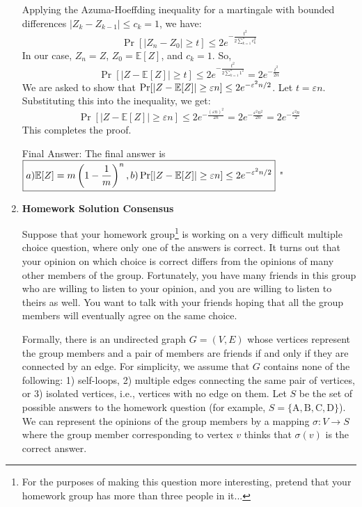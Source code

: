 \begin{enumerate}
\begin{shaded}
Applying the Azuma-Hoeffding inequality for a martingale with bounded differences $|Z_k - Z_{k-1}| \leq c_k = 1$, we have:
$$ \Pr[|Z_n - Z_0| \ge t] \leq 2e^{-\frac{t^2}{2 \sum_{k=1}^n c_k^2}} $$
In our case, $Z_n = Z$, $Z_0 = \mathbb E[Z]$, and $c_k = 1$. So,
$$ \Pr[|Z - \mathbb E[Z]| \ge t] \leq 2e^{-\frac{t^2}{2 \sum_{k=1}^n 1^2}} = 2e^{-\frac{t^2}{2n}} $$
We are asked to show that $\Pr[|Z - \mathbb{E}[Z]| \ge \varepsilon n] \leq 2e^{-\varepsilon^2 n/2}$. Let $t = \varepsilon n$. Substituting this into the inequality, we get:
$$ \Pr[|Z - \mathbb E[Z]| \ge \varepsilon n] \leq 2e^{-\frac{(\varepsilon n)^2}{2n}} = 2e^{-\frac{\varepsilon^2 n^2}{2n}} = 2e^{-\frac{\varepsilon^2 n}{2}} $$
This completes the proof.

Final Answer: The final answer is $\boxed{a) \mathbb E[Z] = m \left(1 - \frac{1}{m}\right)^n, b) \Pr[|Z - \mathbb{E}[Z]| \ge \varepsilon n] \leq 2e^{-\varepsilon^2 n/2}}$
"

\fi
\end{shaded}
\fi


\item {} \textbf{Homework Solution Consensus}

Suppose that your homework group\footnote{For the purposes of making this question more interesting, pretend that your homework group has more than three people in it...} is working on a very difficult multiple choice question, where only one of the answers is correct.
It turns out that your opinion on which choice is correct differs from the opinions of many other members of the group. Fortunately, you have many friends in this group who are willing to listen to your opinion, and you are willing to listen to theirs as well. You want to talk with your friends hoping that all the group members will eventually agree on the same choice.

Formally, there is an undirected graph $G = (V,E)$ whose vertices represent the group members and a pair of members are friends if and only if they are connected by an edge. For simplicity, we assume that $G$ contains none of the following: 1) self-loops, 2) multiple edges connecting the same pair of vertices, or 3) isolated vertices, i.e., vertices with no edge on them.  Let $S$ be the set of possible answers to the homework question (for example, $S = \{\mathrm{A,B,C,D}\}$). We can represent the opinions of the group members by a mapping $\sigma:V\rightarrow S$ where the group member corresponding to vertex $v$ thinks that $\sigma(v)$ is the correct answer.


\end{enumerate}
